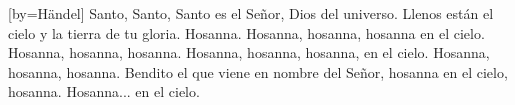 [by={Händel}]
\beginverse
Santo, Santo, Santo es el Señor, Dios del universo.
Llenos están el cielo y la tierra de tu gloria. Hosanna.
\endverse
\beginverse
Hosanna, hosanna, hosanna en el cielo. 
Hosanna, hosanna, hosanna.
Hosanna, hosanna, hosanna, en el cielo.  
Hosanna, hosanna, hosanna.
\endverse
\beginverse
Bendito el que viene en nombre del Señor,  
hosanna en el cielo, hosanna. Hosanna... en el cielo.
\endverse
\endsong